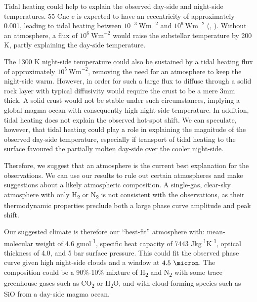 Tidal heating could help to explain the observed day-side and night-side temperatures. 55 Cnc e is expected to have an eccentricity of approximately 0.001, leading to tidal heating between $10^{-3}\ \mathrm{Wm}^{-2}$ and $10^{6}\ \mathrm{Wm}^{-2}$ (\citet{bolmont2013tidal}, \citet{demory2016map}). Without an atmosphere, a flux of $10^{6}\ \mathrm{Wm}^{-2}$ would raise the substellar temperature by 200 K, partly explaining the day-side temperature.

The 1300 K night-side temperature could also be sustained by a tidal heating flux of approximately $10^{5}\ \mathrm{Wm}^{-2}$, removing the need for an atmosphere to keep the night-side warm. However, in order for such a large flux to diffuse through a solid rock layer with typical diffusivity would require the crust to be a mere 3mm thick. A solid crust would not be stable under such circumstances, implying a global magma ocean with consequently high night-side temperature. In addition, tidal heating does not explain the observed hot-spot shift. We can speculate, however, that tidal heating could play a role in explaining the magnitude of the observed day-side temperature, especially if transport of tidal heating to the surface favoured the partially molten day-side over the cooler night-side.

Therefore, we suggest that an atmosphere is the current best explanation for the observations. We can use our results to rule out certain atmospheres and make suggestions about a likely atmospheric composition. A single-gas, clear-sky atmosphere with only H\textsubscript{2} or N\textsubscript{2} is not consistent with the observations, as their thermodynamic properties preclude both a large phase curve amplitude and peak shift.

Our suggested climate is therefore our ``best-fit'' atmosphere with: mean-molecular weight of 4.6 gmol\textsuperscript{-1}, specific heat capacity of 7443 Jkg\textsuperscript{-1}K\textsuperscript{-1}, optical thickness of 4.0, and 5 bar surface pressure. This could fit the observed phase curve given high night-side clouds and a window at $4.5\ \micron$. The composition could be a 90\%-10\% mixture of H\textsubscript{2} and N\textsubscript{2} with some trace greenhouse gases such as CO\textsubscript{2} or H\textsubscript{2}O, and with cloud-forming species such as SiO from a day-side magma ocean.






